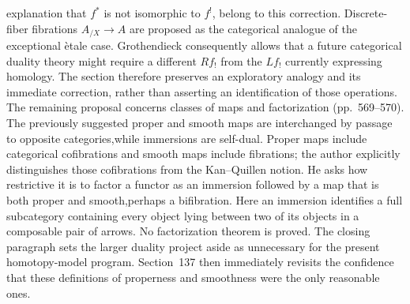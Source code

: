 \documentclass[10pt,oneside]{book}
\begin{document}
explanation that $f^*$ is not isomorphic to $f^!$, belong to this correction. Discrete-fiber fibrations $A_{/X}\to A$ are proposed as the categorical analogue of the exceptional \`etale case. Grothendieck consequently allows that a future categorical duality theory might require a different $Rf_!$ from the $Lf_!$ currently expressing homology. The section therefore preserves an exploratory analogy and its immediate correction, rather than asserting an identification of those operations. The remaining proposal concerns classes of maps and factorization (pp.~569--570). The previously suggested proper and smooth maps are interchanged by passage to opposite categories,while immersions are self-dual. Proper maps include categorical cofibrations and smooth maps include fibrations; the author explicitly distinguishes those cofibrations from the Kan--Quillen notion. He asks how restrictive it is to factor a functor as an immersion followed by a map that is both proper and smooth,perhaps a bifibration. Here an immersion identifies a full subcategory containing every object lying between two of its objects in a composable pair of arrows. No factorization theorem is proved. The closing paragraph sets the larger duality project aside as unnecessary for the present homotopy-model program. Section~137 then immediately revisits the confidence that these definitions of properness and smoothness were the only reasonable ones.
\end{document}
